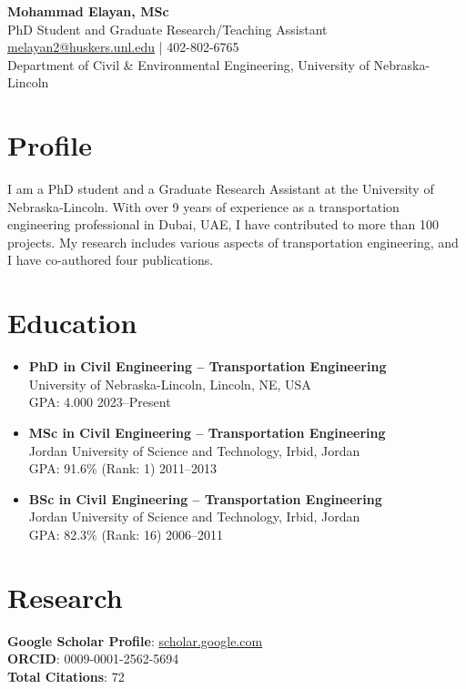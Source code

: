 \documentclass[10pt, letterpaper]{article}
\begin{document}
\begin{center}
    {\LARGE \textbf{Mohammad Elayan, MSc}} \\
    PhD Student and Graduate Research/Teaching Assistant \\
    \href{mailto:melayan2@huskers.unl.edu}{melayan2@huskers.unl.edu} | 402-802-6765 \\
    Department of Civil \& Environmental Engineering, University of Nebraska-Lincoln \\
\end{center}

\vspace{0.5cm}

\section*{Profile}
I am a PhD student and a Graduate Research Assistant at the University of Nebraska-Lincoln. With over 9 years of experience as a transportation engineering professional in Dubai, UAE, I have contributed to more than 100 projects. My research includes various aspects of transportation engineering, and I have co-authored four publications.

\section*{Education}
\begin{itemize}[left=0pt]
    \item \textbf{PhD in Civil Engineering – Transportation Engineering} \\
    University of Nebraska-Lincoln, Lincoln, NE, USA \\
    GPA: 4.000 \hfill 2023–Present
    \item \textbf{MSc in Civil Engineering – Transportation Engineering} \\
    Jordan University of Science and Technology, Irbid, Jordan \\
    GPA: 91.6\% (Rank: 1) \hfill 2011–2013
    \item \textbf{BSc in Civil Engineering – Transportation Engineering} \\
    Jordan University of Science and Technology, Irbid, Jordan \\
    GPA: 82.3\% (Rank: 16) \hfill 2006–2011
\end{itemize}

\section*{Research}
\textbf{Google Scholar Profile}: \href{https://scholar.google.com/citations?user=4ypH5kAAAAAJ&hl=en}{scholar.google.com} \\
\textbf{ORCID}: 0009-0001-2562-5694 \\
\textbf{Total Citations}: 72
\end{document}
